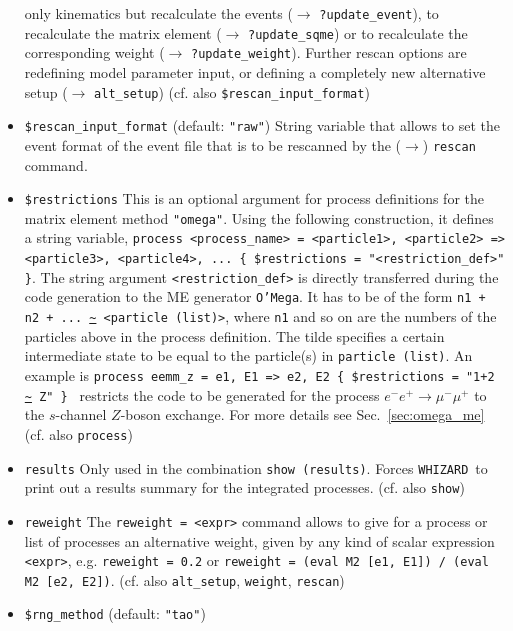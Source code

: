 \documentclass[12pt]{book}
\newcommand{\ttt}[1]{\texttt{#1}}
\newcommand{\whizard}{\texttt{WHIZARD}}
\newcommand{\oMega}{\texttt{O'Mega}}
\begin{document}
\begin{itemize}
only kinematics but recalculate the events ($\to$
\ttt{?update\_event}), to recalculate the matrix element ($\to$
\ttt{?update\_sqme}) or to recalculate the corresponding weight ($\to$
\ttt{?update\_weight}). Further rescan options are redefining model
parameter input, or defining a completely new alternative setup ($\to$
\ttt{alt\_setup}) (cf. also \ttt{\$rescan\_input\_format})  
\item
\ttt{\$rescan\_input\_format} \qquad (default: \ttt{"raw"}) \newline
String variable that allows to set the event format of the event file 
that is to be rescanned by the ($\to$) \ttt{rescan} command. 
\item
\ttt{\$restrictions} \newline
This is an optional argument for process definitions for the matrix
element method \ttt{"omega"}. Using the following construction, it
defines a string variable, \ttt{process \newline <process\_name> =
  <particle1>, <particle2> => <particle3>, <particle4>, ... \{
  \$restrictions = "<restriction\_def>" \}}. The string argument
\ttt{<restriction\_def>} 
is directly transferred during the code generation to the ME generator
\oMega. It has to be of the form \ttt{n1 + n2 + ... 
\url{~} <particle (list)>}, where \ttt{n1} and so on are the numbers of the
particles above in the process definition. The tilde specifies a
certain intermediate state to be equal to the particle(s) in
\ttt{particle (list)}. An example is \ttt{process eemm\_z =     e1,
  E1  =>  e2, E2 \{ \$restrictions = "1+2 \url{~} Z" \} } restricts the code
to be generated for the process $e^- e^+ \to \mu^- \mu^+$ to the
$s$-channel $Z$-boson exchange. For more details see
Sec.~\ref{sec:omega_me} (cf. also \ttt{process})
\item
\ttt{results} \newline
Only used in the combination \ttt{show (results)}. Forces \whizard\ to
print out a results summary for the integrated processes. 
(cf. also \ttt{show})
\item
\ttt{reweight} \newline
The \ttt{reweight = <expr>} command allows to give for a process or
list of processes an alternative weight, given by any kind of scalar
expression \ttt{<expr>}, e.g. \ttt{reweight = 0.2} or \ttt{reweight =
(eval M2 [e1, E1]) / (eval M2 [e2, E2])}. (cf. also \ttt{alt\_setup},
\ttt{weight}, \ttt{rescan})
\item
\ttt{\$rng\_method} \qquad (default: \ttt{"tao"}) \newline

\end{itemize}
\end{document}
